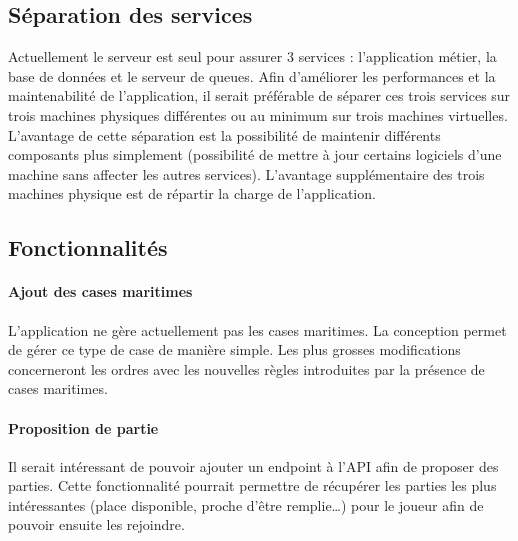 

	\subsection{Séparation des services} %
	\label{sub:separation_des_services}

		Actuellement le serveur est seul pour assurer 3 services : l'application métier, la base de données et le serveur de queues. Afin d'améliorer les performances et la maintenabilité de l'application, il serait préférable de séparer ces trois services sur trois machines physiques différentes ou au minimum sur trois machines virtuelles. L'avantage de cette séparation est la possibilité de maintenir différents composants plus simplement (possibilité de mettre à jour certains logiciels d'une machine sans affecter les autres services). L'avantage supplémentaire des trois machines physique est de répartir la charge de l'application.


	\subsection{Fonctionnalités} %
	\label{sub:fonctionnalites}

		\paragraph{Ajout des cases maritimes} %
		\label{par:ajout_des_cases_maritimes}
			L'application ne gère actuellement pas les cases maritimes. La conception permet de gérer ce type de case de manière simple. Les plus grosses modifications concerneront les ordres avec les nouvelles règles introduites par la présence de cases maritimes.

		\paragraph{Proposition de partie} %
		\label{par:proposition_de_partie}
			Il serait intéressant de pouvoir ajouter un endpoint à l'API afin de proposer des parties. Cette fonctionnalité pourrait permettre de récupérer les parties les plus intéressantes (place disponible, proche d'être remplie\dots) pour le joueur afin de pouvoir ensuite les rejoindre.

